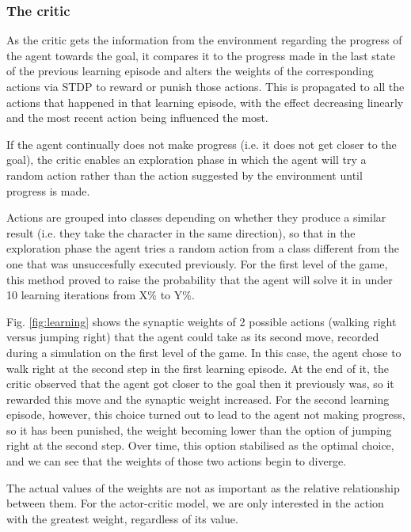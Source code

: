\documentclass[10pt]{article}
\begin{document}
    \subsubsection{The critic}

    As the critic gets the information from the environment regarding the progress of the agent towards the goal, it compares it to the progress made in the last state of the previous learning episode and alters the weights of the corresponding actions via STDP to reward or punish those actions. This is propagated to all the actions that happened in that learning episode, with the effect decreasing linearly and the most recent action being influenced the most.

    If the agent continually does not make progress (i.e. it does not get closer to the goal), the critic enables an exploration phase in which the agent will try a random action rather than the action suggested by the environment until progress is made.

    Actions are grouped into classes depending on whether they produce a similar result (i.e. they take the character in the same direction), so that in the exploration phase the agent tries a random action from a class different from the one that was unsuccesfully executed previously. For the first level of the game, this method proved to raise the probability that the agent will solve it in under 10 learning iterations from X\% to Y\%.

    Fig. \ref{fig:learning} shows the synaptic weights of 2 possible actions (walking right versus jumping right) that the agent could take as its second move, recorded during a simulation on the first level of the game. In this case, the agent chose to walk right at the second step in the first learning episode. At the end of it, the critic observed that the agent got closer to the goal then it previously was, so it rewarded this move and the synaptic weight increased. For the second learning episode, however, this choice turned out to lead to the agent not making progress, so it has been punished, the weight becoming lower than the option of jumping right at the second step. Over time, this option stabilised as the optimal choice, and we can see that the weights of those two actions begin to diverge.

    The actual values of the weights are not as important as the relative relationship between them. For the actor-critic model, we are only interested in the action with the greatest weight, regardless of its value.
\end{document}
